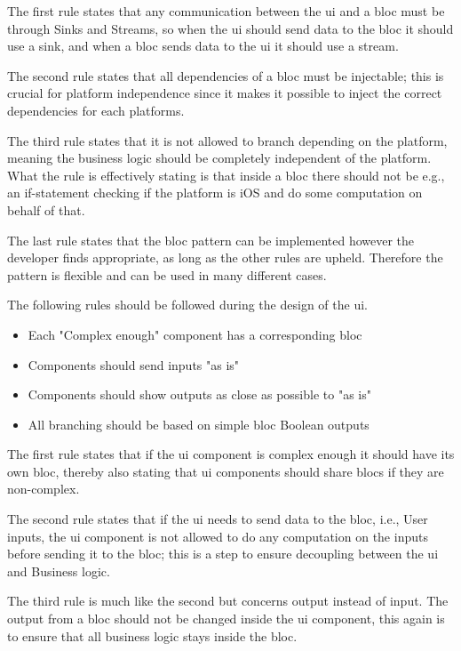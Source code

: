 The first rule states that any communication between the \gls{ui} and a \gls{bloc} must be through Sinks and Streams, so when the \gls{ui} should send data to the \gls{bloc} it should use a sink, and when a \gls{bloc} sends data to the \gls{ui} it should use a stream.

The second rule states that all dependencies of a \gls{bloc} must be injectable; this is crucial for platform independence since it makes it possible to inject the correct dependencies for each platforms.


The third rule states that it is not allowed to branch depending on the platform, meaning the business logic should be completely independent of the platform. What the rule is effectively stating is that inside a \gls{bloc} there should not be e.g., an if-statement checking if the platform is iOS and do some computation on behalf of that.

The last rule states that the \gls{bloc} pattern can be implemented however the developer finds appropriate, as long as the other rules are upheld. Therefore the pattern is flexible and can be used in many different cases.

The following rules should be followed during the design of the \gls{ui}.
\begin{itemize}
  \item Each "Complex enough" component has a corresponding \gls{bloc}
  \item Components should send inputs "as is"
  \item Components should show outputs as close as possible to "as is"
  \item All branching should be based on simple \gls{bloc} Boolean outputs
\end{itemize}

The first rule states that if the \gls{ui} component is complex enough it should have its own \gls{bloc}, thereby also stating that \gls{ui} components should share \glspl{bloc} if they are non-complex.

The second rule states that if the \gls{ui} needs to send data to the \gls{bloc}, i.e., User inputs, the \gls{ui} component is not allowed to do any computation on the inputs before sending it to the \gls{bloc}; this is a step to ensure decoupling between the \gls{ui} and Business logic.

The third rule is much like the second but concerns output instead of input. The output from a \gls{bloc} should not be changed inside the \gls{ui} component, this again is to ensure that all business logic stays inside the \gls{bloc}.

